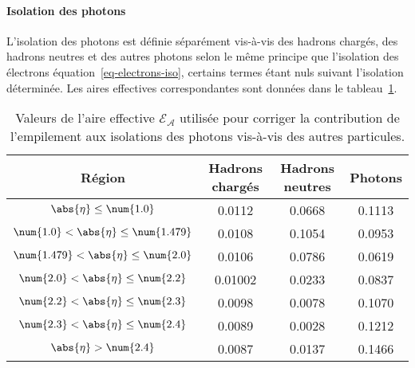 \paragraph{Isolation des photons}
L'isolation des photons est définie séparément vis-à-vis
des hadrons chargés,
des hadrons neutres et
des autres photons
selon le même principe que l'isolation des électrons équation~\eqref{eq-electrons-iso}, certains termes étant nuls suivant l'isolation déterminée.
Les aires effectives correspondantes sont données dans le tableau~\ref{tab-photon-effective_areas}.
\begin{table}[h]
\centering
\begin{tabular}{cccc}
\toprule
Région & Hadrons chargés & Hadrons neutres & Photons \\
\midrule
$\abs{\eta} \leq \num{1.0}$ & \num{0.0112} & \num{0.0668} & \num{0.1113} \\
$\num{1.0} < \abs{\eta} \leq \num{1.479}$ & \num{0.0108} & \num{0.1054} & \num{0.0953} \\
$\num{1.479} < \abs{\eta} \leq \num{2.0}$ & \num{0.0106} & \num{0.0786} & \num{0.0619} \\
$\num{2.0} < \abs{\eta} \leq \num{2.2}$ & \num{0.01002} & \num{0.0233} & \num{0.0837} \\
$\num{2.2} < \abs{\eta} \leq \num{2.3}$ & \num{0.0098} & \num{0.0078} & \num{0.1070} \\
$\num{2.3} < \abs{\eta} \leq \num{2.4}$ & \num{0.0089} & \num{0.0028} & \num{0.1212} \\
$\abs{\eta} > \num{2.4}$ & \num{0.0087} & \num{0.0137} & \num{0.1466} \\
\bottomrule
\end{tabular}
\caption[Aires effectives de correction de l'isolation du photon.]{Valeurs de l'aire effective $\mathcal{E_A}$ utilisée pour corriger la contribution de l'empilement aux isolations des photons vis-à-vis des autres particules.}
\label{tab-photon-effective_areas}
\end{table}
